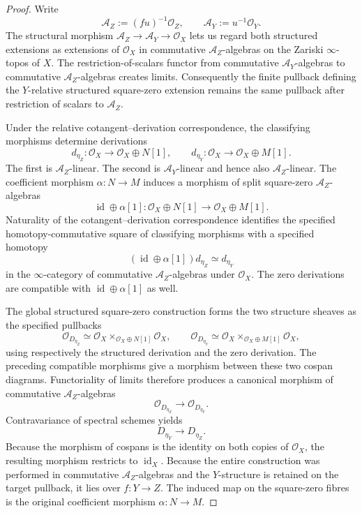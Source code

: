 \begin{proof}
Write
\[
    \mathcal A_Z:=(fu)^{-1}\mathcal O_Z,
    \qquad
    \mathcal A_Y:=u^{-1}\mathcal O_Y.
\]
The structural morphism
$\mathcal A_Z\to\mathcal A_Y\to\mathcal O_X$ lets us regard both structured
extensions as extensions of $\mathcal O_X$ in commutative
$\mathcal A_Z$-algebras on the Zariski $\infty$-topos of $X$.  The
restriction-of-scalars functor from commutative $\mathcal A_Y$-algebras to
commutative $\mathcal A_Z$-algebras creates limits.  Consequently the finite
pullback defining the $Y$-relative structured square-zero extension remains
the same pullback after restriction of scalars to $\mathcal A_Z$.

Under the relative cotangent--derivation correspondence, the classifying
morphisms determine derivations
\[
    d_{\eta_Z}:
    \mathcal O_X\longrightarrow
    \mathcal O_X\oplus N[1],
    \qquad
    d_{\eta_Y}:
    \mathcal O_X\longrightarrow
    \mathcal O_X\oplus M[1].
\]
The first is $\mathcal A_Z$-linear.  The second is
$\mathcal A_Y$-linear and hence also $\mathcal A_Z$-linear.  The coefficient
morphism $\alpha:N\to M$ induces a morphism of split square-zero
$\mathcal A_Z$-algebras
\[
    \operatorname{id}\oplus\alpha[1]:
    \mathcal O_X\oplus N[1]
    \longrightarrow
    \mathcal O_X\oplus M[1].
\]
Naturality of the cotangent--derivation correspondence identifies the
specified homotopy-commutative square of classifying morphisms with a
specified homotopy
\[
    (\operatorname{id}\oplus\alpha[1])d_{\eta_Z}
    \simeq
    d_{\eta_Y}
\]
in the $\infty$-category of commutative $\mathcal A_Z$-algebras under
$\mathcal O_X$.  The zero derivations are compatible with
$\operatorname{id}\oplus\alpha[1]$ as well.

The global structured square-zero construction forms the two structure
sheaves as the specified pullbacks
\[
    \mathcal O_{D_{\eta_Z}}
    \simeq
    \mathcal O_X
    \times_{\mathcal O_X\oplus N[1]}
    \mathcal O_X,
    \qquad
    \mathcal O_{D_{\eta_Y}}
    \simeq
    \mathcal O_X
    \times_{\mathcal O_X\oplus M[1]}
    \mathcal O_X,
\]
using respectively the structured derivation and the zero derivation.  The
preceding compatible morphisms give a morphism between these two cospan
diagrams.  Functoriality of limits therefore produces a canonical morphism
of commutative $\mathcal A_Z$-algebras
\[
    \mathcal O_{D_{\eta_Z}}
    \longrightarrow
    \mathcal O_{D_{\eta_Y}}.
\]
Contravariance of spectral schemes yields
\[
    D_{\eta_Y}\longrightarrow D_{\eta_Z}.
\]
Because the morphism of cospans is the identity on both copies of
$\mathcal O_X$, the resulting morphism restricts to
$\operatorname{id}_X$.  Because the entire construction was performed in
commutative $\mathcal A_Z$-algebras and the $Y$-structure is retained on the
target pullback, it lies over $f:Y\to Z$.  The induced map on the
square-zero fibres is the original coefficient morphism
$\alpha:N\to M$.


\end{proof}
